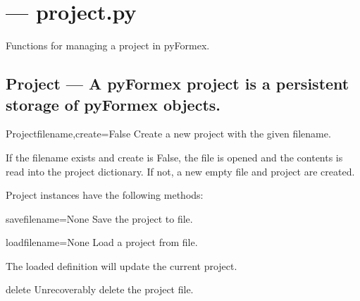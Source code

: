 

\section{ --- project.py}
\label{sec:project}


Functions for managing a project in pyFormex.


\subsection{Project --- A pyFormex project is a persistent storage of pyFormex objects.}


\begin{classdesc}{Project}{filename,create=False}
Create a new project with the given filename.

        If the filename exists and create is False, the file is opened and
        the contents is read into the project dictionary.
        If not, a new empty file and project are created.
        
\end{classdesc}

Project instances have the following methods:

\begin{funcdesc}{save}{filename=None}
Save the project to file.
\end{funcdesc}

\begin{funcdesc}{load}{filename=None}
Load a project from file.
        
        The loaded definition will update the current project.
        
\end{funcdesc}

\begin{funcdesc}{delete}{}
Unrecoverably delete the project file.
\end{funcdesc}


